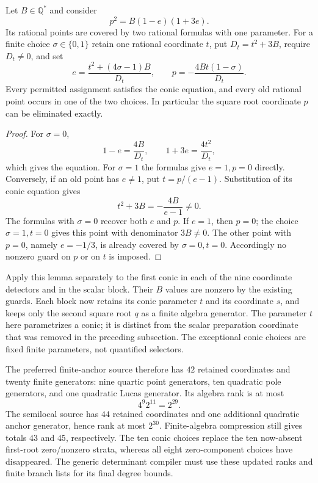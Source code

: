 \begin{lemma}
\label{lem:pole-conic-parametrization}
Let $B\in\mathbb Q^*$ and consider
\[
                        p^2=B(1-e)(1+3e).
\]
Its rational points are covered by two rational formulas with
one parameter.  For a finite choice $\sigma\in\{0,1\}$ retain
one rational coordinate $t$, put $D_t=t^2+3B$, require $D_t\ne0$,
and set
\[
 e=\frac{t^2+(4\sigma-1)B}{D_t},
 \qquad p=-\frac{4Bt(1-\sigma)}{D_t}.
\]
Every permitted assignment satisfies the conic equation, and every
old rational point occurs in one of the two choices.  In particular
the square root coordinate $p$ can be eliminated exactly.
\end{lemma}
\begin{proof}
For $\sigma=0$,
\[
                 1-e=\frac{4B}{D_t},\qquad
                 1+3e=\frac{4t^2}{D_t},
\]
which gives the equation.  For $\sigma=1$ the formulas give
$e=1,p=0$ directly.  Conversely, if an old point has $e\ne1$,
put $t=p/(e-1)$.  Substitution of its conic equation gives
\[
                       t^2+3B=-\frac{4B}{e-1}\ne0.
\]
The formulas with $\sigma=0$ recover both $e$ and $p$.  If
$e=1$, then $p=0$; the choice $\sigma=1,t=0$ gives this point
with denominator $3B\ne0$.  The other point with $p=0$,
namely $e=-1/3$, is already covered by $\sigma=0,t=0$.
Accordingly no nonzero guard on $p$ or on $t$ is imposed.
\end{proof}

Apply this lemma separately to the first conic in each of the
nine coordinate detectors and in the scalar block.  Their
$B$ values are nonzero by the existing guards.  Each block now
retains its conic parameter $t$ and its coordinate $s$, and
keeps only the second square root $q$ as a finite algebra
generator.  The parameter $t$ here parametrizes a conic; it
is distinct from the scalar preparation coordinate that was
removed in the preceding subsection.  The exceptional conic
choices are fixed finite parameters, not quantified selectors.

The preferred finite-anchor source therefore has $42$ retained
coordinates and twenty finite generators: nine quartic point
generators, ten quadratic pole generators, and one quadratic
Lucas generator.  Its algebra rank is at most
\[
                         4^9 2^{11}=2^{29}.
\]
The semilocal source has $44$ retained coordinates and one
additional quadratic anchor generator, hence rank at most
$2^{30}$.  Finite-algebra compression still gives totals
$43$ and $45$, respectively.  The ten conic choices replace
the ten now-absent first-root zero/nonzero strata, whereas
all eight zero-component choices have disappeared.  The
generic determinant compiler must use these updated ranks
and finite branch lists for its final degree bounds.
